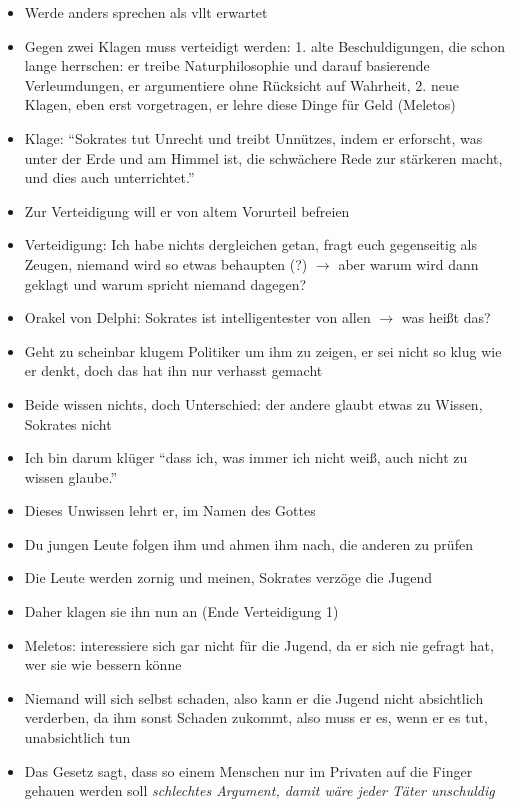 \documentclass[emulatestandardclasses]{scrartcl}
\begin{document}
\begin{itemize}
  \item Werde anders sprechen als vllt erwartet
  \item Gegen zwei Klagen muss verteidigt werden: 1. alte Beschuldigungen, die schon lange herrschen: er treibe Naturphilosophie und darauf basierende Verleumdungen, er argumentiere ohne Rücksicht auf Wahrheit, 2. neue Klagen, eben erst vorgetragen, er lehre diese Dinge für Geld (Meletos)
  \item Klage: "`Sokrates tut Unrecht und treibt Unnützes, indem er erforscht, was unter der Erde und am Himmel ist, die schwächere Rede zur stärkeren macht, und dies auch unterrichtet."'
  \item Zur Verteidigung will er von altem Vorurteil befreien
  \item Verteidigung: Ich habe nichts dergleichen getan, fragt euch gegenseitig als Zeugen, niemand wird so etwas behaupten (?) $\rightarrow$ aber warum wird dann geklagt und warum spricht niemand dagegen?
  \item Orakel von Delphi: Sokrates ist intelligentester von allen $\rightarrow$ was heißt das?
  \item Geht zu scheinbar klugem Politiker um ihm zu zeigen, er sei nicht so klug wie er denkt, doch das hat ihn nur verhasst gemacht
  \item Beide wissen nichts, doch Unterschied: der andere glaubt etwas zu Wissen, Sokrates nicht
  \item Ich bin darum klüger "`dass ich, was immer ich nicht weiß, auch nicht zu wissen glaube."'
  \item Dieses Unwissen lehrt er, im Namen des Gottes
  \item Du jungen Leute folgen ihm und ahmen ihm nach, die anderen zu prüfen
  \item Die Leute werden zornig und meinen, Sokrates verzöge die Jugend
  \item Daher klagen sie ihn nun an (Ende Verteidigung 1)
  \item Meletos: interessiere sich gar nicht für die Jugend, da er sich nie gefragt hat, wer sie wie bessern könne
  \item Niemand will sich selbst schaden, also kann er die Jugend nicht absichtlich verderben, da ihm sonst Schaden zukommt, also muss er es, wenn er es tut, unabsichtlich tun
  \item Das Gesetz sagt, dass so einem Menschen nur im Privaten auf die Finger gehauen werden soll \emph{schlechtes Argument, damit wäre jeder Täter unschuldig}

\end{itemize}
\end{document}
